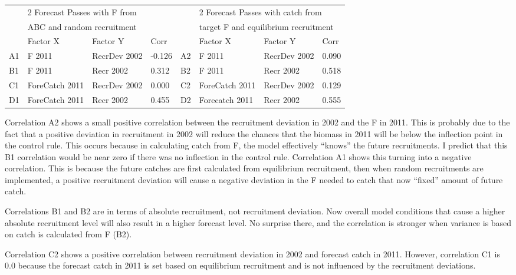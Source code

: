 \begin{center}
	\begin{longtable}{p{0.4cm} p{2.75cm} p{3cm} p{1cm} p{0.4cm} p{2.75cm} p{2cm} p{1cm}}
		\hline
		 & \multicolumn{3}{l}{2 Forecast Passes with F from} & & \multicolumn{3}{l}{2 Forecast Passes with catch from}\\
		 & \multicolumn{3}{l}{ABC and random recruitment} & & \multicolumn{3}{l}{target F and equilibrium recruitment}\\
		\hline
		 & Factor X & Factor Y & Corr &  & Factor X & Factor Y & Corr \\
		 \hline
		 A1 & F 2011 & RecrDev 2002 & -0.126 & A2 & F 2011 & RecrDev 2002 & 0.090 \\
		 B1 & F 2011 & Recr 2002    &  0.312 & B2 & F 2011 & Recr    2002 & 0.518 \\
		 C1 & ForeCatch 2011 & RecrDev 2002 & 0.000 & C2 & ForeCatch 2011 & RecrDev 2002 & 0.129 \\
		 D1 & ForeCatch 2011 & Recr 2002    & 0.455 & D2 & Forecatch 2011 & Recr 2002    & 0.555 \\
		 \hline		
	\end{longtable}
\end{center}

Correlation A2 shows a small positive correlation between the recruitment deviation in 2002 and the F in 2011.  This is probably due to the fact that a positive deviation in recruitment in 2002 will reduce the chances that the biomass in 2011 will be below the inflection point in the control rule.  This occurs because in calculating catch from F, the model effectively “knows” the future recruitments.  I predict that this B1 correlation would be near zero if there was no inflection in the control rule.
Correlation A1 shows this turning into a negative correlation.  This is because the future catches are first calculated from equilibrium recruitment, then when random recruitments are implemented, a positive recruitment deviation will cause a negative deviation in the F needed to catch that now “fixed” amount of future catch.

Correlations B1 and B2 are in terms of absolute recruitment, not recruitment deviation.  Now overall model conditions that cause a higher absolute recruitment level will also result in a higher forecast level.  No surprise there, and the correlation is stronger when variance is based on catch is calculated from F (B2).

Correlation C2 shows a positive correlation between recruitment deviation in 2002 and forecast catch in 2011.  However, correlation C1 is 0.0 because the forecast catch in 2011 is set based on equilibrium recruitment and is not influenced by the recruitment deviations.

